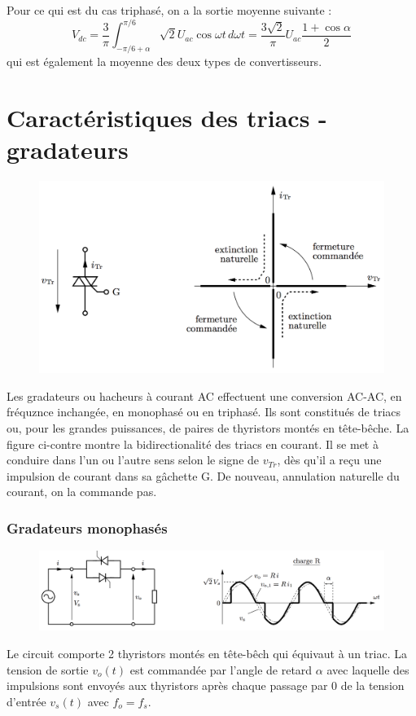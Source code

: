 		Pour ce qui est du cas triphasé, on a la sortie moyenne suivante : 
		\begin{equation}
			V_{dc} = \frac{3}{\pi} \int _{-\pi /6 + \alpha}^{\pi /6} \sqrt{2} U_{ac} \cos \omega t \, d\omega t = \frac{3\sqrt{2}}{\pi}U_{ac} \frac{1+\cos \alpha}{2}
		\end{equation}
		qui est également la moyenne des deux types de convertisseurs. 
		
	\section{Caractéristiques des triacs - gradateurs}
		\begin{figure}
		\vspace{-5mm}
		\includegraphics[scale=0.28]{ch3/12}
		\label{fig:3.12}
		\end{figure}
		Les gradateurs ou hacheurs à courant AC effectuent une conversion AC-AC, en fréquznce inchangée, en monophasé ou en triphasé. Ils sont constitués de triacs ou, pour les grandes puissances, de paires de thyristors montés en tête-bêche. La figure ci-contre montre la bidirectionalité des triacs en courant. Il se met à conduire dans l'un ou l'autre sens selon le signe de $v_{Tr}$, dès qu'il a reçu une impulsion de courant dans sa gâchette G. De nouveau, annulation naturelle du courant, on la commande pas. 
		
			\subsubsection{Gradateurs monophasés}
		 	\begin{figure}
			\vspace{-5mm}
			\includegraphics[scale=0.28]{ch3/13}
			\label{fig:3.13}
			\end{figure}
			Le circuit comporte 2 thyristors montés en tête-bêch qui équivaut à un triac. La tension de sortie $v_o(t)$ est commandée par l'angle de retard $\alpha$ avec laquelle des impulsions sont envoyés aux thyristors après chaque passage par 0 de la tension d'entrée $v_s(t)$ avec $f_o = f_s$. 
			
